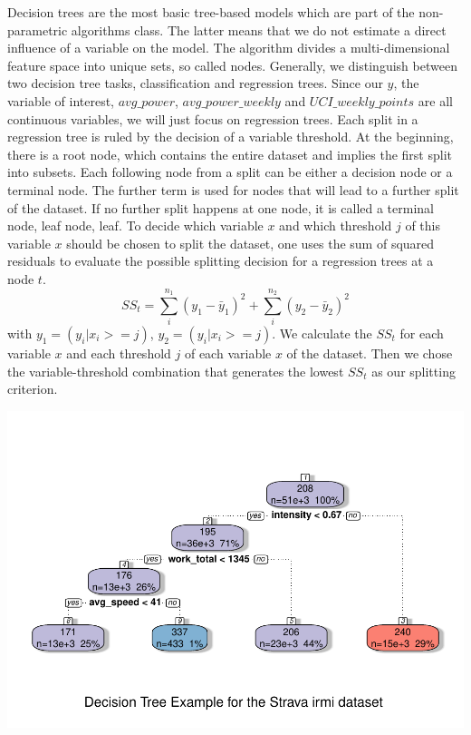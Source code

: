 \documentclass[12pt,a4paper]{article}
\let\origfigure\figure
\let\endorigfigure\endfigure
\renewenvironment{figure}[1][2] {
    \expandafter\origfigure\expandafter[H]
} {
    \endorigfigure
}
\begin{document}
Decision trees are the most basic tree-based models which are part of the non-parametric algorithms class. The latter means that we do not estimate a direct influence of a variable on the model. The algorithm divides a multi-dimensional feature space into unique sets, so called nodes. Generally, we distinguish between two decision tree tasks, classification and regression trees. Since our \(y\), the variable of interest, \(avg\_power\), \(avg\_power\_weekly\) and \(UCI\_weekly\_points\) are all continuous variables, we will just focus on regression trees. Each split in a regression tree is ruled by the decision of a variable threshold. At the beginning, there is a root node, which contains the entire dataset and implies the first split into subsets. Each following node from a split can be either a decision node or a terminal node. The further term is used for nodes that will lead to a further split of the dataset. If no further split happens at one node, it is called a terminal node, leaf node, leaf. To decide which variable \(x\) and which threshold \(j\) of this variable \(x\) should be chosen to split the dataset, one uses the sum of squared residuals to evaluate the possible splitting decision for a regression trees at a node \(t\).
\begin{equation}
SS_{t} = \sum_i^{n_{1}} (y_1 - \bar{y}_1)^2 + \sum_i^{n_{2}} (y_2 - \bar{y}_2)^2
\end{equation}
with \(y_1 = (y_i|x_i>=j)\), \(y_2 = (y_i|x_i>=j)\). We calculate the \(SS_t\) for each variable \(x\) and each threshold \(j\) of each variable \(x\) of the dataset. Then we chose the variable-threshold combination that generates the lowest \(SS_t\) as our splitting criterion.

\begin{figure}[!H]
\includegraphics{Master_Thesis_files/figure-latex/decision-tree-1} \caption{Decision Tree Example for the Strava irmi dataset}\label{fig:decision-tree}
\end{figure}
\end{document}
